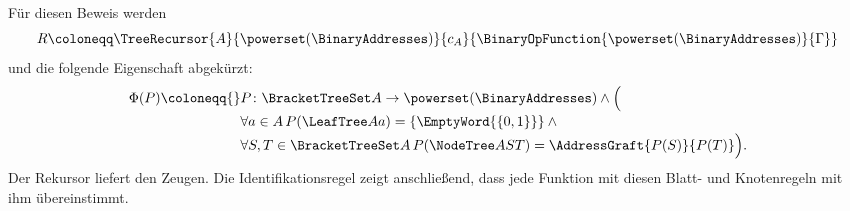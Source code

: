 Für diesen Beweis werden
\[
  R\coloneqq\TreeRecursor{A}{\powerset(\BinaryAddresses)}{c_A}
    {\BinaryOpFunction{\powerset(\BinaryAddresses)}{\Gamma}}
\]
und die folgende Eigenschaft abgekürzt:
\[
  \begin{aligned}
    \Phi(P)\coloneqq{}&
      P\colon\BracketTreeSet A\to\powerset(\BinaryAddresses)\land\Bigl(\\[-2pt]
    &\forall a\in A\,P(\LeafTree A a)=\{\EmptyWord{\{0,1\}}\}\land{}\\[-2pt]
    &\forall S,T\in\BracketTreeSet A\,
      P(\NodeTree A S T)=\AddressGraft{P(S)}{P(T)}\Bigr).
  \end{aligned}
\]
Der Rekursor liefert den Zeugen. Die Identifikationsregel zeigt anschließend,
dass jede Funktion mit diesen Blatt- und Knotenregeln mit ihm übereinstimmt.

